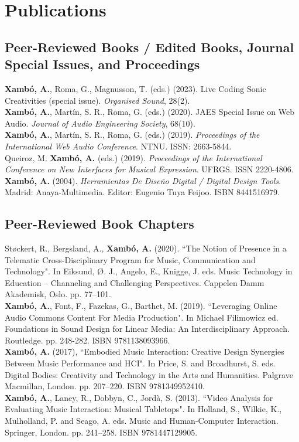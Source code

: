 \documentclass[10pt, a4paper]{article}
\newcommand{\years}[1]{\marginnote{\scriptsize #1}}
\begin{document}
\section*{Publications}

\subsection*{Peer-Reviewed Books / Edited Books, Journal Special Issues, and Proceedings}
\noindent

\years{2023}\textbf{Xambó, A.}, Roma, G., Magnusson, T. (eds.) (2023). Live Coding Sonic Creativities (special issue). \emph{Organised Sound}, 28(2).\\
\years{2020b}\textbf{Xambó, A.},  Martín, S. R., Roma, G. (eds.) (2020). JAES Special Issue on Web Audio. \emph{Journal of Audio Engineering Society}, 68(10).\\
\years{2020a}\textbf{Xambó, A.},  Martín, S. R., Roma, G. (eds.) (2019). \emph{Proceedings of the International Web Audio Conference}. NTNU. ISSN: 2663-5844.\\
\years{2019}Queiroz, M. \textbf{Xambó, A.} (eds.) (2019). \emph{Proceedings of the International Conference on New Interfaces for Musical Expression}. UFRGS. ISSN 2220-4806.\\
\years{2004}\textbf{Xambó, A.} (2004). \emph{Herramientas De Diseño Digital / Digital Design Tools}. Madrid: Anaya-Multimedia. Editor: Eugenio Tuya Feijoo. ISBN 8441516979.

\subsection*{Peer-Reviewed Book Chapters}
\noindent

\years{2020}Støckert, R., Bergsland, A., \textbf{Xambó, A.} (2020). “The Notion of Presence in a Telematic Cross-Disciplinary Program for Music, Communication and Technology". In Eiksund, Ø. J., Angelo, E., Knigge, J. eds. Music Technology in Education -- Channeling and Challenging Perspectives. Cappelen Damm Akademisk, Oslo. pp. 77--101.\\
\years{2019}\textbf{Xambó, A.}, Font, F., Fazekas, G., Barthet, M. (2019). “Leveraging Online Audio Commons Content For Media Production". In Michael Filimowicz ed. Foundations in Sound Design for Linear Media: An Interdisciplinary Approach. Routledge. pp. 248-282. ISBN 9781138093966.\\
\years{2016}\textbf{Xambó, A.} (2017), “Embodied Music Interaction: Creative Design Synergies Between Music Performance and HCI". In Price, S. and Broadhurst, S. eds. Digital Bodies: Creativity and Technology in the Arts and Humanities. Palgrave Macmillan, London. pp. 207--220. ISBN 9781349952410.\\
\years{2013}\textbf{Xambó, A.}, Laney, R., Dobbyn, C., Jordà, S. (2013). “Video Analysis for Evaluating Music Interaction: Musical Tabletops". In Holland, S., Wilkie, K., Mulholland, P. and Seago, A. eds. Music and Human-Computer Interaction. Springer, London. pp. 241--258. ISBN 9781447129905.
\end{document}
